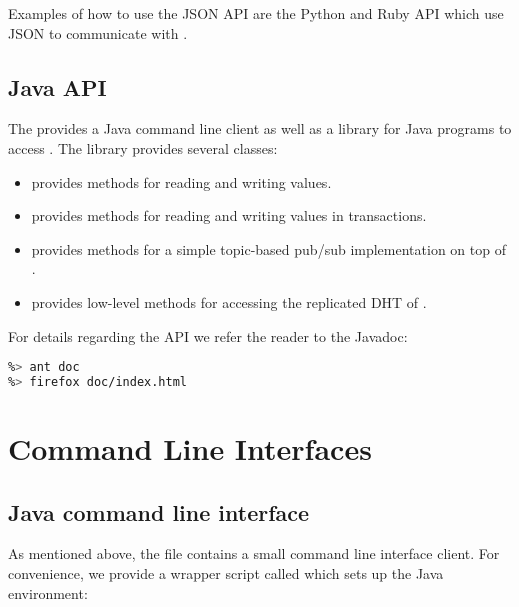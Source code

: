 Examples of how to use the JSON API are the Python and Ruby API which use JSON
to communicate with \scalaris{}.


\subsection{Java API}

The  provides a Java command line client as well as a
library for Java programs to access \scalaris{}. The library provides several
classes:

\begin{itemize}
\item {} provides methods for reading and writing values.
\item {} provides methods for reading and writing values in transactions.
\item {} provides methods for a simple topic-based pub/sub implementation on top of \scalaris{}.
\item {} provides low-level methods for accessing the replicated DHT of \scalaris{}.
\end{itemize}

For details regarding the API we refer the reader to the Javadoc:

\begin{lstlisting}[language=sh]
%> cd java-api
%> ant doc
%> firefox doc/index.html
\end{lstlisting}

\section{Command Line Interfaces}

\subsection{Java command line interface}

As mentioned above, the  file contains a small command line
interface client. For
convenience, we provide a wrapper script called  which
sets up the Java environment:

\begin{lstlisting}[language=sh]
%> ./java-api/scalaris --noconfig --help
\end{lstlisting}



